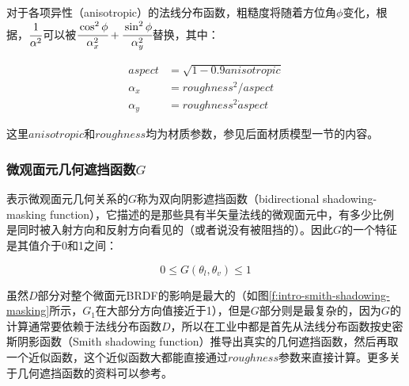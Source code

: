 对于各项异性（anisotropic）的法线分布函数，粗糙度将随着方位角$\phi$变化，根据\cite{a:PhysicallyBasedShadingatDisney}，$ \cfrac{1}{\alpha^2}$可以被$ \cfrac{\cos^2\phi}{\alpha^2_x}+ \cfrac{\sin^2\phi}{\alpha^2_y}$替换，其中：

\begin{equation}
\begin{aligned}
	aspect&=\sqrt{1-0.9 anisotropic}\\
	\alpha_x &=roughness^2/aspect\\
		\alpha_y &=roughness^2\dot aspect
\end{aligned}
\end{equation}

\noindent 这里$anisotropic$和$roughness$均为材质参数，参见后面材质模型一节的内容。




\subsubsection{微观面元几何遮挡函数$G$}
表示微观面元几何关系的$G$称为双向阴影遮挡函数（bidirectional shadowing-masking function），它描述的是那些具有半矢量法线的微观面元中，有多少比例是同时被入射方向和反射方向看见的（或者说没有被阻挡的）。因此$G$的一个特征是其值介于0和1之间：

\begin{equation}
	0\leq G(\theta_l,\theta_v)\leq 1
\end{equation}

\noindent 虽然$D$部分对整个微面元BRDF的影响是最大的（如图\ref{f:intro-smith-shadowing-masking}所示，$G_1$在大部分方向值接近于1），但是$G$部分则是最复杂的，因为$G$的计算通常要依赖于法线分布函数$D$，所以在工业中都是首先从法线分布函数按史密斯阴影函数（Smith shadowing function）推导出真实的几何遮挡函数，然后再取一个近似函数，这个近似函数大都能直接通过$roughness$参数来直接计算。更多关于几何遮挡函数的资料可以参考\cite{a:UnderstandingtheMaskingShadowingFunctioninMicrofacetBasedBRDFs}。

